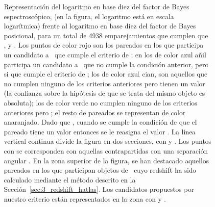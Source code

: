 \begin{figure}[ht]
\begin{center}
  \end{center}
  \vspace*{-20mm}
  \caption{\small Representación del logaritmo en base diez del factor de Bayes espectroscópico,  (en la figura, el logaritmo está en escala logarítmica) frente al logaritmo en base diez del factor de Bayes posicional,  para un total de 4938 emparejamientos que cumplen que ,  y . Los puntos de color rojo son los pareados en los que participa un candidato a \halo\ que cumple el criterio de \cite{article:Negrello_2010}; en los de color azul añil participa un candidato a \halo\ que no cumple la condición anterior, pero si que cumple el criterio de \cite{article:Nuevo_2012}; los de color azul cian, son aquellos que no cumplen ninguno de los criterios anteriores pero tienen un  valor  (la confianza sobre la hipótesis de que se trata del mismo objeto es absoluta); los de color verde no cumplen ninguno de los criterios anteriores pero ; el resto de pareados se representan de color anaranjado. Dado que , cuando se cumple la condición de que el pareado tiene un valor  entonces se le reasigna el valor  . La línea vertical continua divide la figura en dos secciones, con  y . Los puntos con  se corresponden con aquellas contrapartidas con una separación angular . En la zona superior de la figura, se han destacado aquellos pareados en los que participan objetos de \hatlas\ cuyo redshift ha sido calculado mediante el método descrito en la Sección~\ref{sec:3_redshift_hatlas}. Los candidatos propuestos por nuestro criterio están representados en la zona con  y .}
  \label{fig:log_bayes}
\end{figure}